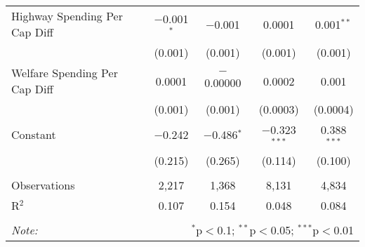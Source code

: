 \begin{table}[!htbp]
\begin{tabular}{@{\extracolsep{5pt}}lcccc}
  Highway Spending Per Cap Diff & $-$0.001$^{*}$ & $-$0.001 & 0.0001 & 0.001$^{**}$ \\ 
  & (0.001) & (0.001) & (0.001) & (0.001) \\ 
  Welfare Spending Per Cap Diff & 0.0001 & $-$0.00000 & 0.0002 & 0.001 \\ 
  & (0.001) & (0.001) & (0.0003) & (0.0004) \\ 
  Constant & $-$0.242 & $-$0.486$^{*}$ & $-$0.323$^{***}$ & 0.388$^{***}$ \\ 
  & (0.215) & (0.265) & (0.114) & (0.100) \\ 
 \hline \\[-1.8ex] 
Observations & 2,217 & 1,368 & 8,131 & 4,834 \\ 
R$^{2}$ & 0.107 & 0.154 & 0.048 & 0.084 \\ 
\hline 
\hline \\[-1.8ex] 
\textit{Note:}  & \multicolumn{4}{r}{$^{*}$p$<$0.1; $^{**}$p$<$0.05; $^{***}$p$<$0.01} \\ 
\end{tabular} 
\end{table} 
